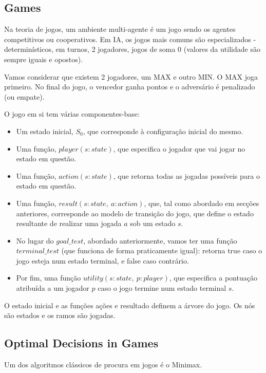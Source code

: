 \documentclass[11pt]{article}
\begin{document}
\subsection{Games}

Na teoria de jogos, um ambiente multi-agente é um jogo sendo os agentes competitivos ou cooperativos. Em IA, os jogos mais comuns são especializados - determinísticos, em turnos, 2 jogadores, jogos de soma 0 (valores da utilidade são sempre iguais e opostos).\vspace{4pt}

Vamos considerar que existem 2 jogadores, um MAX e outro MIN. O MAX joga primeiro. No final do jogo, o vencedor ganha pontos e o adversário é penalizado (ou empate).\vspace{4pt}

O jogo em si tem várias componentes-base:
\begin{itemize}[topsep=4pt, itemsep=0pt]
    \item Um estado inicial, $S_0$, que corresponde à configuração inicial do mesmo.
    \item Uma função, $player(s:state)$, que especifica o jogador que vai jogar no estado em questão.
    \item Uma função, $action(s:state)$, que retorna todas as jogadas possíveis para o estado em questão.
    \item Uma função, $result(s:state,\ a:action)$, que, tal como abordado em secções anteriores, corresponde ao modelo de transição do jogo, que define o estado resultante de realizar uma jogada $a$ sob um estado $s$.
    \item No lugar do $goal\_test$, abordado anteriormente, vamos ter uma função $terminal\_test$ (que funciona de forma praticamente igual): retorna true caso o jogo esteja num estado terminal, e false caso contrário.
    \item Por fim, uma função $utility(s:state,\ p:player)$, que especifica a pontuação atribuída a um jogador $p$ caso o jogo termine num estado terminal $s$.
\end{itemize}

O estado inicial e as funções ações e resultado definem a árvore do jogo. Os nós são estados e os ramos são jogadas.

\subsection{Optimal Decisions in Games}

Um dos algoritmos clássicos de procura em jogos é o Minimax.\vspace{4pt}
\end{document}
